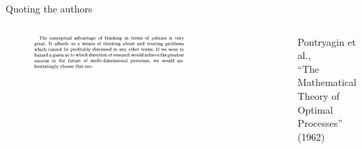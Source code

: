 \documentclass[aspectratio=169]{beamer}
\begin{document}
\begin{frame}{Quoting the authors}
\begin{columns}
\begin{figure}[h]
\includegraphics[width=.9\columnwidth]{figures/bellman_quote_3.png}
\end{figure}
\begin{columns}
\begin{figure}
\includegraphics[width=\columnwidth]{figures/pontryagin.jpg}
\end{figure}
Pontryagin et al., \\
``The Mathematical Theory of Optimal Processes'' (1962)
\end{columns}


\end{columns}
\end{frame}
\end{document}
